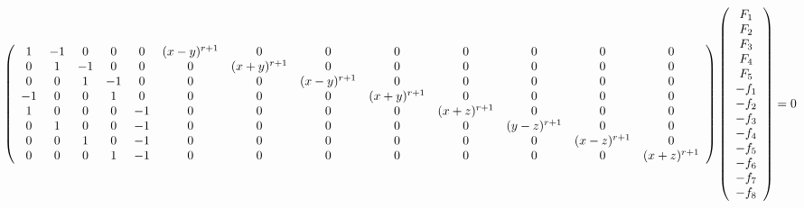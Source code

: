 \documentclass{beamer}
\theoremstyle{definition}
\theoremstyle{remark}
\begin{document}
\begin{frame}
\[
\hspace{-.5cm}
\left(
\begin{array}{ccccccccccccc}
 1 & -1 & 0 & 0 & 0 & (x-y)^{r+1} & 0 & 0 & 0 & 0 & 0 & 0 & 0 \\
 0 & 1 & -1 & 0 & 0 & 0 & (x+y)^{r+1} & 0 & 0 & 0 & 0 & 0 & 0 \\
 0 & 0 & 1 & -1 & 0 & 0 & 0 & (x-y)^{r+1} & 0 & 0 & 0 & 0 & 0 \\
 -1 & 0 & 0 & 1 & 0 & 0 & 0 & 0 & (x+y)^{r+1} & 0 & 0 & 0 & 0 \\
 1 & 0 & 0 & 0 & -1 & 0 & 0 & 0 & 0 & (x+z)^{r+1} & 0 & 0 & 0 \\
 0 & 1 & 0 & 0 & -1 & 0 & 0 & 0 & 0 & 0 & (y-z)^{r+1} & 0 & 0 \\
 0 & 0 & 1 & 0 & -1 & 0 & 0 & 0 & 0 & 0 & 0 & (x-z)^{r+1} & 0 \\
 0 & 0 & 0 & 1 & -1 & 0 & 0 & 0 & 0 & 0 & 0 & 0 & (x+z)^{r+1} \\
\end{array}
\right)
\left(
\begin{array}{c}
F_1\\
F_2\\
F_3\\
F_4\\
F_5\\
-f_1\\
-f_2\\
-f_3\\
-f_4\\
-f_5\\
-f_6\\
-f_7\\
-f_8
\end{array}
\right)
=0
\]

\end{frame}
\end{document}
